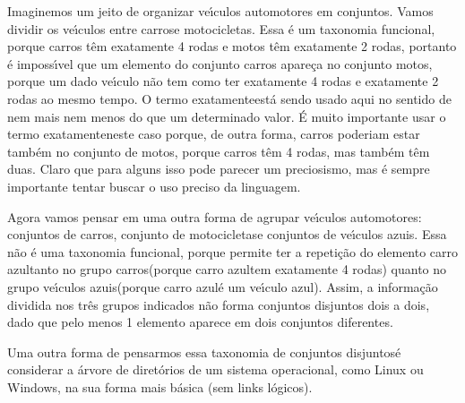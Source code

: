 \documentclass[
12pt,		%
openright,	%
twoside,  %
a4paper,			%
chapter=TITLE,		%
english,			%
french,				%
spanish,			%
brazil				%
]{USPSC-classe/USPSC}
\begin{document}
Imaginemos um jeito de organizar ve\'{\i}culos automotores em conjuntos. Vamos dividir os ve\'{\i}culos entre \textquotedbl carros\textquotedbl  e \textquotedbl motocicletas\textquotedbl . Essa \'e um taxonomia funcional, porque carros t\^em exatamente 4 rodas e motos t\^em exatamente 2 rodas, portanto \'e imposs\'{\i}vel que um elemento do conjunto carros apare\c{c}a no conjunto motos, porque um dado ve\'{\i}culo n\~ao tem como ter exatamente 4 rodas e exatamente 2 rodas ao mesmo tempo. O termo \textquotedbl exatamente\textquotedbl  est\'a sendo usado aqui no sentido de \textquotedbl nem mais nem menos do que um determinado valor\textquotedbl . \'E muito importante usar o termo \textquotedbl exatamente\textquotedbl  neste caso porque, de outra forma, carros poderiam estar tamb\'em no conjunto de motos, porque carros t\^em 4 rodas, mas tamb\'em t\^em duas. Claro que para alguns isso pode parecer um preciosismo, mas \'e sempre importante tentar buscar o uso preciso da linguagem.










Agora vamos pensar em uma outra forma de agrupar ve\'{\i}culos automotores: conjuntos de \textquotedbl carros\textquotedbl , conjunto de \textquotedbl motocicletas\textquotedbl  e conjuntos de \textquotedbl ve\'{\i}culos azuis\textquotedbl . Essa n\~ao \'e uma taxonomia funcional, porque permite ter a repeti\c{c}\~ao do elemento \textquotedbl carro azul\textquotedbl  tanto no grupo \textquotedbl carros\textquotedbl  (porque \textquotedbl carro azul\textquotedbl  tem exatamente 4 rodas) quanto no grupo \textquotedbl ve\'{\i}culos azuis\textquotedbl  (porque \textquotedbl carro azul\textquotedbl  \'e um \textquotedbl ve\'{\i}culo azul\textquotedbl ). Assim, a informa\c{c}\~ao dividida nos tr\^es grupos indicados n\~ao forma conjuntos disjuntos dois a dois, dado que pelo menos 1 elemento aparece em dois conjuntos diferentes.










Uma outra forma de pensarmos essa \textquotedbl taxonomia de conjuntos disjuntos\textquotedbl  \'e considerar a \'arvore de diret\'orios de um sistema operacional, como Linux ou Windows, na sua forma mais b\'asica (sem links l\'ogicos).
\end{document}
